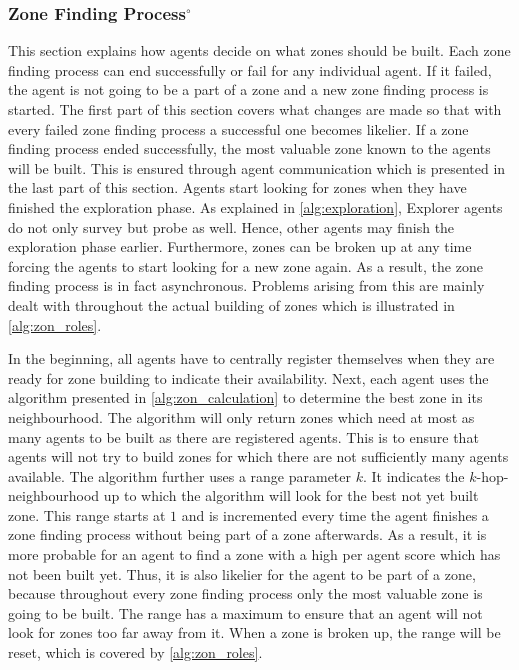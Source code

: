 \subsubsection[Zone Finding Process]{Zone Finding Process$^\circ$}\label{alg:zon_finding}
This section explains how agents decide on what zones should be built.
Each zone finding process can end successfully or fail for any individual agent.
If it failed, the agent is not going to be a part of a zone and a new zone finding process is started.
The first part of this section covers what changes are made so that with every failed zone finding process a successful one becomes likelier.
If a zone finding process ended successfully, the most valuable zone known to the agents will be built.
This is ensured through agent communication which is presented in the last part of this section.
Agents start looking for zones when they have finished the exploration phase.
As explained in \autoref{alg:exploration}, Explorer agents do not only survey but probe as well.
Hence, other agents may finish the exploration phase earlier.
Furthermore, zones can be broken up at any time forcing the agents to start looking for a new zone again.
As a result, the zone finding process is in fact asynchronous.
Problems arising from this are mainly dealt with throughout the actual building of zones which is illustrated in \autoref{alg:zon_roles}.

In the beginning, all agents have to centrally register themselves when they are ready for zone building to indicate their availability.
Next, each agent uses the algorithm presented in \autoref{alg:zon_calculation} to determine the best zone in its neighbourhood.
The algorithm will only return zones which need at most as many agents to be built as there are registered agents.
This is to ensure that agents will not try to build zones for which there are not sufficiently many agents available.
The algorithm further uses a range parameter $k$.
It indicates the $k$-hop-neighbourhood up to which the algorithm will look for the best not yet built zone.
This range starts at $1$ and is incremented every time the agent finishes a zone finding process without being part of a zone afterwards.
As a result, it is more probable for an agent to find a zone with a high per agent score which has not been built yet.
Thus, it is also likelier for the agent to be part of a zone, because throughout every zone finding process only the most valuable zone is going to be built.
The range has a maximum to ensure that an agent will not look for zones too far away from it.
When a zone is broken up, the range will be reset, which is covered by \autoref{alg:zon_roles}.

